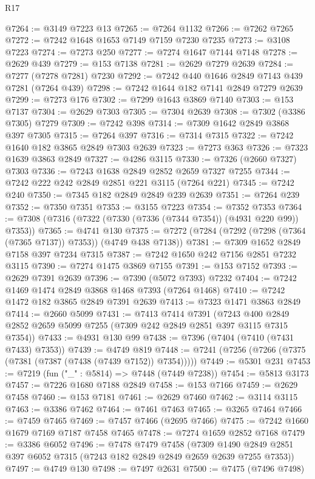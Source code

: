 \begin{lexlean}{R17}
\begin{coremodule}
@7264 := @3149 @7223 @13
@7265 := @7264 @1132
@7266 := @7262 @7265
@7272 := @7242 @1648 @1653 @7149 @7159 @7230 @7235
@7273 := @3108 @7223
@7274 := @7273 @250
@7277 := @7274 @1647 @7144 @7148
@7278 := @2629 @439
@7279 := @153 @7138
@7281 := @2629 @7279 @2639
@7284 := @7277 (@7278 @7281) @7230
@7292 := @7242 @440 @1646 @2849 @7143 @439 @7281 (@7264 @439)
@7298 := @7242 @1644 @182 @7141 @2849 @7279 @2639
@7299 := @7273 @176
@7302 := @7299 @1643 @3869 @7140
@7303 := @153 @7137
@7304 := @2629 @7303
@7305 := @7304 @2639
@7308 := @7302 (@3386 @7305) @7279
@7309 := @7242 @398
@7314 := @7309 @1642 @2849 @3868 @397 @7305
@7315 := @7264 @397
@7316 := @7314 @7315
@7322 := @7242 @1640 @182 @3865 @2849 @7303 @2639
@7323 := @7273 @363
@7326 := @7323 @1639 @3863 @2849
@7327 := @4286 @3115
@7330 := @7326 (@2660 @7327) @7303
@7336 := @7243 @1638 @2849 @2852 @2659 @7327 @7255
@7344 := @7242 @222 @242 @2849 @2851 @221 @3115 (@7264 @221)
@7345 := @7242 @240
@7350 := @7345 @182 @2849 @2849 @239 @2639
@7351 := @7264 @239
@7352 := @7350 @7351
@7353 := @3155 @7223
@7354 := @7352 @7353
@7364 := @7308 (@7316 (@7322 (@7330 (@7336 (@7344 @7354)) (@4931 @220 @99)) @7353))
@7365 := @4741 @130
@7375 := @7272 (@7284 (@7292 (@7298 (@7364 (@7365 @7137)) @7353)) (@4749 @438 @7138))
@7381 := @7309 @1652 @2849 @7158 @397 @7234 @7315
@7387 := @7242 @1650 @242 @7156 @2851 @7232 @3115
@7390 := @7274 @1475 @3869 @7155
@7391 := @153 @7152
@7393 := @2629 @7391 @2639
@7396 := @7390 (@5072 @7393) @7232
@7404 := @7242 @1469 @1474 @2849 @3868 @1468 @7393 (@7264 @1468)
@7410 := @7242 @1472 @182 @3865 @2849 @7391 @2639
@7413 := @7323 @1471 @3863 @2849
@7414 := @2660 @5099
@7431 := @7413
    @7414
    @7391
    (@7243 @400 @2849 @2852 @2659 @5099 @7255 (@7309 @242 @2849 @2851 @397 @3115 @7315 @7354))
@7433 := @4931 @130 @99
@7438 := @7396 (@7404 (@7410 (@7431 @7433) @7353))
@7439 := @4749 @819
@7448 := @7241 (@7256 (@7266 (@7375 (@7381 (@7387 (@7438 (@7439 @7152)) @7354)))))
@7449 := @5301 @231
@7453 := @7219 (fun ("_" : @5814) => @7448 (@7449 @7238))
@7454 := @5813 @3173
@7457 := @7226 @1680 @7188 @2849
@7458 := @153 @7166
@7459 := @2629 @7458
@7460 := @153 @7181
@7461 := @2629 @7460
@7462 := @3114 @3115
@7463 := @3386 @7462
@7464 := @7461 @7463
@7465 := @3265 @7464
@7466 := @7459 @7465
@7469 := @7457 @7466 (@2695 @7466)
@7475 := @7242 @1660 @1679 @7169 @7187 @7458 @7465
@7478 := @7274 @1659 @2852 @7168
@7479 := @3386 @6052
@7496 := @7478
    @7479
    @7458
    (@7309 @1490 @2849 @2851 @397 @6052 @7315 (@7243 @182 @2849 @2849 @2659 @2639 @7255 @7353))
@7497 := @4749 @130
@7498 := @7497 @2631
@7500 := @7475 (@7496 @7498)

\end{coremodule}
\end{lexlean}

